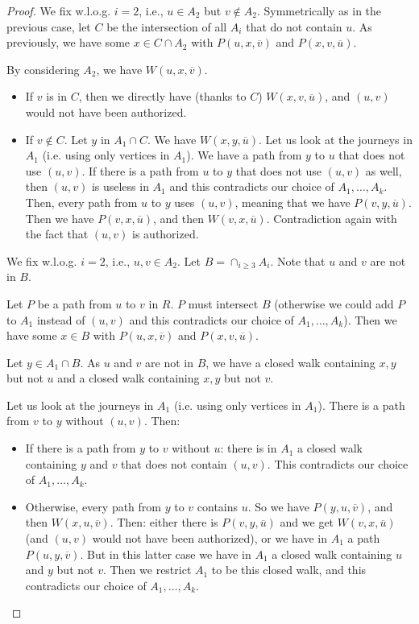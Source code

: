 \documentclass[11pt]{article}%
\begin{document}
\begin{proof}
We fix w.l.o.g. $i=2$, i.e., $u\in A_2$ but $v\not\in A_2$. Symmetrically as in the previous case, let $C$ be the intersection of all $A_i$ that do not contain $u$.
As previously, we have some $x\in C\cap A_2$ with $P(u,x,\overline{v})$ and $P(x,v,\overline{u})$. 
 
By considering $A_2$, we have $W(u,x,\overline{v})$. 
\begin{itemize}
	\item If $v$ is in $C$, then we directly have (thanks to $C$) $W(x,v,\overline{u})$, and $(u,v)$ would not have been authorized.
	\item If $v\not\in C$. Let $y$ in $A_1\cap C$. We have $W(x,y,\overline{u})$. Let us look at the journeys in $A_1$ (i.e. using only vertices in $A_1$). We have a path from $y$ to $u$ that does not use $(u,v)$. If there is a path from $u$ to $y$ that does not use $(u,v)$ as well, then $(u,v)$ is useless in $A_1$ and this contradicts our choice of $A_1,\dots, A_k$. Then, every path from $u$ to $y$ uses $(u,v)$, meaning that we have $P(v,y,\overline{u})$. Then we have $P(v,x,\overline{u})$, and then $W(v,x,\overline{u})$. Contradiction again with the fact that $(u,v)$ is authorized. \\
\end{itemize}
 
 

We fix w.l.o.g. $i=2$, i.e., $u,v\in A_2$. Let $B=\cap_{i\geq 3} A_i$. Note that $u$ and $v$ are not in $B$.

Let $P$ be a path from $u$ to $v$ in $R$. $P$ must intersect $B$ (otherwise we could add $P$ to $A_1$ instead of $(u,v)$ and this contradicts our choice of $A_1,\dots, A_k$). Then we have some $x\in B$ with $P(u,x,\overline{v})$ and $P(x,v,\overline{u})$. 

Let $y\in A_1\cap B$. As $u$ and $v$ are not in $B$, we have a closed walk containing $x,y$ but not $u$ and a closed walk containing $x,y$ but not $v$. 

Let us look at the journeys in $A_1$ (i.e. using only vertices in $A_1$). There is a path from $v$ to $y$ without $(u,v)$. Then:
\begin{itemize}
\item If there is a path from $y$ to $v$ without $u$: there is in $A_1$ a closed walk containing $y$ and $v$ that does not contain $(u,v)$. This contradicts our choice of $A_1,\dots, A_k$. 
\item Otherwise, every path from $y$ to $v$ contains $u$. So we have $P(y,u,\overline{v})$, and then $W(x,u,\overline{v})$. Then: either there is $P(v,y,\overline{u})$ and we get $W(v,x,\overline{u})$ (and $(u,v)$ would not have been authorized), or we have in $A_1$ a path $P(u,y,\overline{v})$. But in this latter case we have in $A_1$ a closed walk containing $u$ and $y$ but not $v$. Then we restrict $A_1$ to be this closed walk, and this contradicts our choice of $A_1,\dots, A_k$. \qedhere


\end{itemize}
\end{proof}
\end{document}
